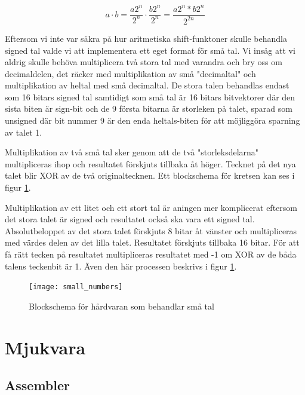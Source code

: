 \documentclass[a4paper]{article}
\begin{document}
    \begin{equation}
        \label{eq:mult_shift}
        a \cdot b = \frac{a 2^n}{2^n} \cdot \frac{b 2^n}{2^n} = \frac{a2^n *
        b2^n}{2^{2n}}
    \end{equation}

    Eftersom vi inte var säkra på hur aritmetiska shift-funktoner skulle
    behandla signed tal valde vi att implementera ett eget format för små tal.
    Vi insåg att vi aldrig skulle behöva multiplicera två stora tal med varandra
    och bry oss om decimaldelen, det räcker med multiplikation av små
    "decimaltal" och multiplikation av heltal med små decimaltal. De stora talen
    behandlas endast som 16 bitars signed tal samtidigt som små tal är 16 bitars
    bitvektorer där den sista biten är sign-bit och de 9 första bitarna är
    storleken på talet, sparad som unsigned där bit nummer 9 är den enda heltals-biten
    för att möjliggöra sparning av talet 1. 

    Multiplikation av två små tal sker genom att de två "storleksdelarna"
    multipliceras ihop och resultatet förskjuts tillbaka åt höger. Tecknet på
    det nya talet blir XOR av de två originaltecknen. Ett blockschema för
    kretsen kan ses i figur \ref{fig:small_numbers}.

    Multiplikation av ett litet och ett stort tal är aningen mer komplicerat
    eftersom det stora talet är signed och resultatet också ska vara ett
    signed tal. Absolutbeloppet av det stora talet förskjuts 8 bitar åt vänster
    och multipliceras med värdes delen av det lilla talet. Resultatet förskjuts
    tillbaka 16 bitar. För att få rätt tecken på resultatet multipliceras
    resultatet med -1 om XOR av de båda talens teckenbit är 1. Även den här
    processen beskrivs i figur \ref{fig:small_numbers}.

    \begin{figure}[H]
        \centering
        \texttt{[image: small\_numbers]}
        \caption{Blockschema för hårdvaran som behandlar små tal}
        \label{fig:small_numbers}
    \end{figure}


    \section{Mjukvara}
    \subsection{Assembler}
\end{document}
